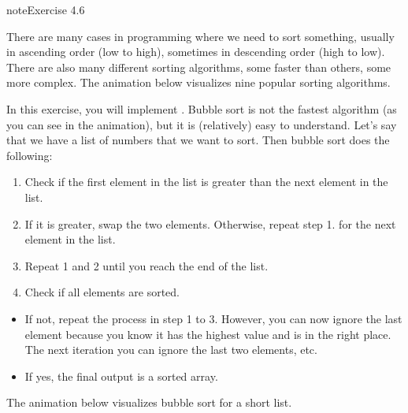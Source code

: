\documentclass[letterpaper,10pt,english]{jupyterBook}
\begin{document}
\begin{sphinxadmonition}{note}{Exercise 4.6}

\sphinxAtStartPar
There are many cases in programming where we need to sort something, usually in ascending order (low to high), sometimes in descending order (high to low). There are also many different sorting algorithms, some faster than others, some more complex. The animation below visualizes nine popular sorting algorithms.

\sphinxAtStartPar
{}

\sphinxAtStartPar
In this exercise, you will implement . Bubble sort is not the fastest algorithm (as you can see in the animation), but it is (relatively) easy to understand. Let’s say that we have a list of numbers that we want to sort. Then bubble sort does the following:
\begin{enumerate}
%
\item {} 
\sphinxAtStartPar
Check if the first element in the list is greater than the next element in the list.

\item {} 
\sphinxAtStartPar
If it is greater, swap the two elements. Otherwise, repeat step 1. for the next element in the list.

\item {} 
\sphinxAtStartPar
Repeat 1 and 2 until you reach the end of the list.

\item {} 
\sphinxAtStartPar
Check if all elements are sorted.

\end{enumerate}
\begin{itemize}
\item {} 
\sphinxAtStartPar
If not, repeat the process in step 1 to 3. However, you can now ignore the last element because you know it has the highest value and is in the right place. The next iteration you can ignore the last two elements, etc.

\item {} 
\sphinxAtStartPar
If yes, the final output is a sorted array.

\end{itemize}

\sphinxAtStartPar
The animation below visualizes bubble sort for a short list.


\end{sphinxadmonition}
\end{document}
